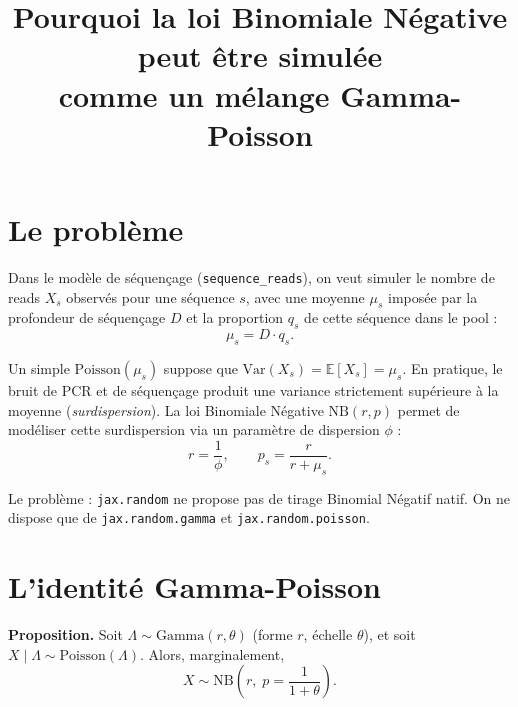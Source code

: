 \documentclass[11pt]{article}
\title{Pourquoi la loi Binomiale Négative peut être simulée\\comme un mélange Gamma-Poisson}
\author{}
\date{}
\begin{document}
\maketitle

\section{Le problème}

Dans le modèle de séquençage (\texttt{sequence\_reads}), on veut simuler le nombre de reads
$X_s$ observés pour une séquence $s$, avec une moyenne $\mu_s$ imposée par la profondeur de
séquençage $D$ et la proportion $q_s$ de cette séquence dans le pool :
\[
  \mu_s = D \cdot q_s .
\]

Un simple $\mathrm{Poisson}(\mu_s)$ suppose que $\mathrm{Var}(X_s) = \mathbb{E}[X_s] = \mu_s$.
En pratique, le bruit de PCR et de séquençage produit une variance strictement supérieure à la
moyenne (\emph{surdispersion}). La loi Binomiale Négative $\mathrm{NB}(r,p)$ permet de modéliser
cette surdispersion via un paramètre de dispersion $\phi$ :
\[
  r = \frac{1}{\phi}, \qquad p_s = \frac{r}{r+\mu_s}.
\]

Le problème : \texttt{jax.random} ne propose pas de tirage Binomial Négatif natif. On ne dispose
que de \texttt{jax.random.gamma} et \texttt{jax.random.poisson}.

\section{L'identité Gamma-Poisson}

\textbf{Proposition.} Soit $\Lambda \sim \mathrm{Gamma}(r, \theta)$ (forme $r$, échelle $\theta$),
et soit $X \mid \Lambda \sim \mathrm{Poisson}(\Lambda)$. Alors, marginalement,
\[
  X \sim \mathrm{NB}\!\left(r,\; p = \frac{1}{1+\theta}\right).
\]
\end{document}
